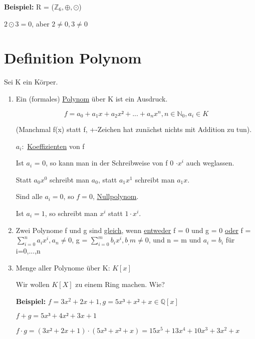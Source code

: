 \documentclass[a4paper, openany]{book}
\begin{document}
  \textbf{Beispiel:} R = ($\mathbb{Z}_6, \oplus, \odot$)

  $2 \odot 3 = 0$, aber $2 \neq 0, 3 \neq 0$
  
  \section{Definition Polynom}

  Sei K ein Körper. 

  \begin{enumerate}[label=(\alph*)]
    \item Ein (formales) \underline{Polynom} über K ist ein Ausdruck.

    \begin{equation}
      f = a_0 + a_1x+ a_2x² + ... + a_nx^n, n \in \mathbb{N}_0, a_i \in K
    \end{equation}

    (Manchmal f(x) statt f, +-Zeichen hat zunächst nichts mit Addition zu tun).

    $a_i:$ \underline{Koeffizienten} von f

    Ist $a_i$ = 0, so kann man in der Schreibweise von f 0 $\cdot x^i$ auch weglassen.

    \par \medskip

    Statt $a_0x^0$ schreibt man $a_0$, statt $a_1x^1$ schreibt man $a_1x$.

    Sind alle $a_i = 0$, so $f = 0$, \underline{Nullpolynom}.

    Ist $a_i = 1$, so schreibt man $x^i$ statt $1 \cdot x^i$.

    \item Zwei Polynome f und g sind \underline{gleich}, wenn \underline{entweder} f = 0 und g = 0 \underline{oder} f = $\sum_{i=0}^{n} a_ix^i, a_n \neq 0$, g = $\sum_{i=0}^{m} b_ix^i, b_,m \neq 0$, und n = m und $a_i = b_i$ für i=0,...,n

    \item Menge aller Polynome über K: $K[x]$

    Wir wollen $K[X]$ zu einem Ring machen. Wie?

    \textbf{Beispiel:} $f = 3x^2 + 2x + 1, g = 5x³ + x² + x \in \mathbb{Q}[x]$

    $f+g = 5x³ + 4x² + 3x + 1$

    $f \cdot g = (3x² + 2x +1) \cdot (5x³ + x² + x) = 15x^5 + 13x^4 + 10x^3 + 3x^2 + x$
 \end{enumerate}
\end{document}
